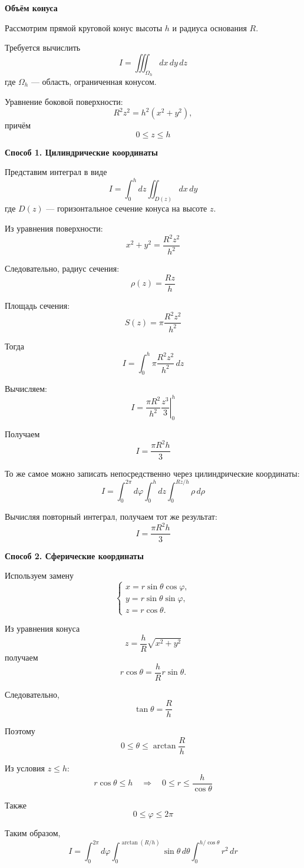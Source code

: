 \documentclass[12pt,a4paper]{article}
\begin{document}
\begin{example}
\textbf{Объём конуса}

Рассмотрим прямой круговой конус высоты $h$ и радиуса основания $R$.

Требуется вычислить
\[
I=\iiint_{\Omega_h}dx\,dy\,dz
\]
где $\Omega_h$ — область, ограниченная конусом.

Уравнение боковой поверхности:
\[
R^2z^2=h^2(x^2+y^2),
\]
причём
\[
0\leq z\leq h
\]

\textbf{Способ 1. Цилиндрические координаты}

Представим интеграл в виде
\[
I=\int_0^h dz\iint_{D(z)}dx\,dy
\]
где $D(z)$ — горизонтальное сечение конуса на высоте $z$.

Из уравнения поверхности:
\[
x^2+y^2=\frac{R^2z^2}{h^2}
\]

Следовательно, радиус сечения:
\[
\rho(z)=\frac{Rz}{h}
\]

Площадь сечения:
\[
S(z)=\pi\frac{R^2z^2}{h^2}
\]

Тогда
\[
I=\int_0^h\pi\frac{R^2z^2}{h^2}\,dz
\]

Вычисляем:
\[
I=
\frac{\pi R^2}{h^2}
\left.\frac{z^3}{3}\right|_0^h
\]

Получаем
\[
I=\frac{\pi R^2h}{3}
\]

То же самое можно записать непосредственно через цилиндрические координаты:
\[
I=
\int_0^{2\pi}d\varphi
\int_0^h dz
\int_0^{Rz/h}\rho\,d\rho
\]

Вычисляя повторный интеграл, получаем тот же результат:
\[
I=\frac{\pi R^2h}{3}
\]

\textbf{Способ 2. Сферические координаты}

Используем замену
\[
\begin{cases}
x=r\sin\theta\cos\varphi,\\
y=r\sin\theta\sin\varphi,\\
z=r\cos\theta.
\end{cases}
\]

Из уравнения конуса
\[
z=\frac{h}{R}\sqrt{x^2+y^2}
\]
получаем
\[
r\cos\theta=\frac{h}{R}r\sin\theta.
\]

Следовательно,
\[
\tan\theta=\frac{R}{h}
\]

Поэтому
\[
0\leq\theta\leq\arctan\frac{R}{h}
\]

Из условия $z\leq h$:
\[
r\cos\theta\leq h
\quad\Longrightarrow\quad
0\leq r\leq\frac{h}{\cos\theta}
\]

Также
\[
0\leq\varphi\leq2\pi
\]

Таким образом,
\[
I=
\int_0^{2\pi}d\varphi
\int_0^{\arctan(R/h)}
\sin\theta\,d\theta
\int_0^{h/\cos\theta}r^2\,dr
\]


\end{example}
\end{document}
